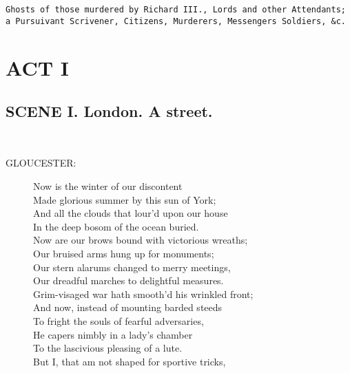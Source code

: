 \documentclass{article}
\begin{document}
{\tt Ghosts of those murdered by Richard III., Lords and other Attendants; a Pursuivant Scrivener, Citizens, Murderers, Messengers Soldiers, \&c.}\\

\newpage
\section*{ACT I}
\subsection*{SCENE I.  London. A street.}
\\
\begin{description}
\item[GLOUCESTER:] 
\hspace{1pt}Now is the winter of our discontent\\
\hspace{1pt}Made glorious summer by this sun of York;\\
\hspace{1pt}And all the clouds that lour'd upon our house\\
\hspace{1pt}In the deep bosom of the ocean buried.\\
\hspace{1pt}Now are our brows bound with victorious wreaths;\\
\hspace{1pt}Our bruised arms hung up for monuments;\\
\hspace{1pt}Our stern alarums changed to merry meetings,\\
\hspace{1pt}Our dreadful marches to delightful measures.\\
\hspace{1pt}Grim-visaged war hath smooth'd his wrinkled front;\\
\hspace{1pt}And now, instead of mounting barded steeds\\
\hspace{1pt}To fright the souls of fearful adversaries,\\
\hspace{1pt}He capers nimbly in a lady's chamber\\
\hspace{1pt}To the lascivious pleasing of a lute.\\
\hspace{1pt}But I, that am not shaped for sportive tricks,\\

\end{description}
\end{document}
